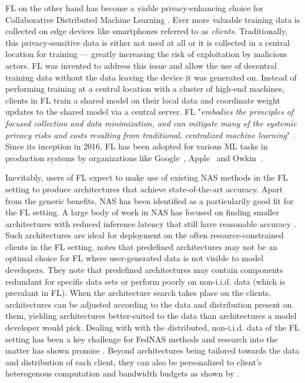 FL on the other hand has become a viable privacy-enhancing choice for Collaborative Distributed Machine Learning \cite{cdml_2024}. Ever more valuable training data is collected on edge devices like smartphones referred to as \textit{clients}. Traditionally, this privacy-sensitive data is either not used at all or it is collected in a central location for training — greatly increasing the risk of exploitation by malicious actors. FL was invented to address this issue and allow the use of decentral training data without the data leaving the device it was generated on. Instead of performing training at a central location with a cluster of high-end machines, clients in FL train a shared model on their local data and coordinate weight updates to the shared model via a central server. FL "\textit{embodies the principles of focused collection and data minimization, and can mitigate many of the systemic privacy risks and costs resulting from traditional, centralized machine learning}" \cite{fl_advances_and_open_problems_2021}. Since its inception in 2016, FL has been adopted for various ML tasks in production systems by organizations like Google~\cite{gboard_fl_2018}, Apple~\cite{apple_fl_case_study_2025} and Owkin~\cite{owkin_fl_drug_discovery_in_prod_2022}.

Inevitably, users of FL expect to make use of existing NAS methods in the FL setting to produce architectures that achieve state-of-the-art accuracy. Apart from the generic benefits, NAS has been identified as a particularily good fit for the FL setting. A large body of work in NAS has focused on finding smaller architectures with reduced inference latency that still have reasonable accuracy \cite{nas_1000_papers_2023}. Such architectures are ideal for deployment on the often resource-constrained clients in the FL setting. \cite{fl_advances_and_open_problems_2021} notes that predefined architectures may not be an optimal choice for FL where user-generated data is not visible to model developers. They note that predefined architectures may contain components redundant for specific data sets or perform poorly on non-i.i.d. data (which is prevalant in FL). When the architecture search takes place on the clients, architectures can be adjusted according to the data and distribution present on them, yielding architectures better-suited to the data than architectures a model developer would pick. Dealing with with the distributed, non-i.i.d. data of the FL setting has been a key challenge for FedNAS methods and research into the matter has shown promise \cite{fednas_2021} \cite{rl_fednas_2021} \cite{fedoras_2022} \cite{finch_2024} \cite{peaches_2024}. Beyond architectures being tailored towards the data and distribution of each client, they can also be personalized to client's heterogenous computation and bandwidth budgets as shown by \cite{superfednas_2024} \cite{fedoras_2022} \cite{perfedrlnas_2024} \cite{decnas_2022}. 

